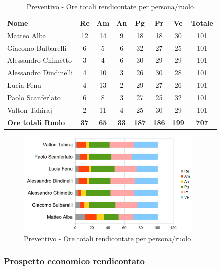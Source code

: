 		\begin{table} [h!]
			\begin{center}
				\begin{tabular} { m{3.5cm} c c c c c c c }
					\rowcolor{lightgray}
					\textbf{Nome} & \textbf{Re} & \textbf{Am} & \textbf{An} & \textbf{Pg} & \textbf{Pr} & \textbf{Ve} & \textbf{Totale} \\
					Matteo Alba & 12 & 14 & 9 & 18 & 18 & 30 & 101 \\
					Giacomo Bulbarelli & 6 & 5 & 6 & 32 & 27 & 25 & 101 \\
					Alessandro Chimetto & 3 & 4 & 6 & 30 & 29 & 29 & 101 \\
					Alessandro Dindinelli & 4 & 10 & 3 & 26 & 30 & 28 & 101 \\
					Lucia Fenu & 4 & 13 & 2 & 29 & 27 & 26 & 101 \\
					Paolo Scanferlato & 6 & 8 & 3 & 27 & 25 & 32 & 101 \\
					Valton Tahiraj & 2 & 11 & 4 & 25 & 30 & 29 & 101 \\
					\textbf{Ore totali Ruolo} & \textbf{37} & \textbf{65} & \textbf{33} & \textbf{187} & \textbf{186}& \textbf{199} & \textbf{707}
				\end{tabular}
				\caption{Preventivo - Ore totali rendicontate per persona/ruolo}
			\end{center}
		\end{table}
	
		\begin{figure} [h!]
			\centering
			\includegraphics[width=0.8\textwidth]{res/img/grafici/OreRendicontate.jpg}
			\caption{Preventivo - Ore totali rendicontate per persona/ruolo} 
		\end{figure}
	
	\newpage
	
	\subsubsection{Prospetto economico rendicontato}
	
